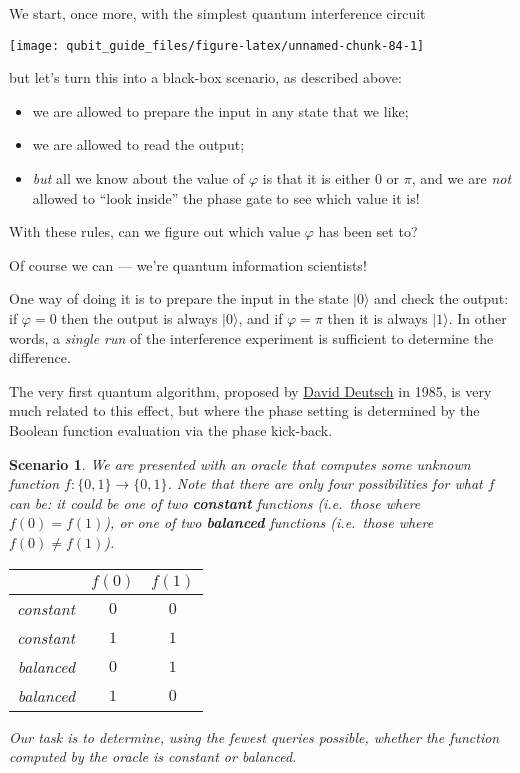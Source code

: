 \documentclass[fleqn]{article}
\providecommand{\tightlist}{%
  \setlength{\itemsep}{0pt}\setlength{\parskip}{0pt}}
\newtheorem*{scenario}{Scenario}
\begin{document}
We start, once more, with the simplest quantum interference circuit

\begin{center}\texttt{[image: qubit\_guide\_files/figure-latex/unnamed-chunk-84-1]} \end{center}

but let's turn this into a black-box scenario, as described above:

\begin{itemize}
\tightlist
\item
  we are allowed to prepare the input in any state that we like;
\item
  we are allowed to read the output;
\item
  \emph{but} all we know about the value of \(\varphi\) is that it is either \(0\) or \(\pi\), and we are \emph{not} allowed to ``look inside'' the phase gate to see which value it is!
\end{itemize}

With these rules, can we figure out which value \(\varphi\) has been set to?

Of course we can --- we're quantum information scientists!

One way of doing it is to prepare the input in the state \(|0\rangle\) and check the output: if \(\varphi=0\) then the output is always \(|0\rangle\), and if \(\varphi=\pi\) then it is always \(|1\rangle\).
In other words, a \emph{single run} of the interference experiment is sufficient to determine the difference.

The very first quantum algorithm, proposed by \href{https://en.wikipedia.org/wiki/David_Deutsch}{David Deutsch} in 1985, is very much related to this effect, but where the phase setting is determined by the Boolean function evaluation via the phase kick-back.

\begin{scenario}
We are presented with an oracle that computes some unknown function \(f\colon\{0,1\}\to\{0,1\}\).
Note that there are only four possibilities for what \(f\) can be: it could be one of two \textbf{constant} functions (i.e.~those where \(f(0)=f(1)\)), or one of two \textbf{balanced} functions (i.e.~those where \(f(0)\neq f(1)\)).

\begin{longtable}[]{@{}rcc@{}}
\toprule()
& \(f(0)\) & \(f(1)\) \\
\midrule()
\endhead
constant & \(0\) & \(0\) \\
constant & \(1\) & \(1\) \\
balanced & \(0\) & \(1\) \\
balanced & \(1\) & \(0\) \\
\bottomrule()
\end{longtable}

Our task is to determine, using the fewest queries possible, whether the function computed by the oracle is constant or balanced.

\end{scenario}
\end{document}
